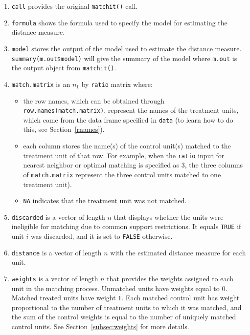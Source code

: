 \documentclass[oneside,letterpaper,titlepage]{article}
\begin{document}
\begin{enumerate}
\item \texttt{call} provides the original {\tt matchit()} call.
  
\item \texttt{formula} shows the formula used to specify the model for
  estimating the distance measure.
  
\item \texttt{model} stores the output of the model used to estimate
  the distance measure.  \texttt{summary(m.out\$model)} will give the
  summary of the model where \texttt{m.out} is the output object from
  \texttt{matchit()}.
  
\item \texttt{match.matrix} is an $n_1$ by \texttt{ratio} matrix
  where:
  \begin{itemize}
  \item the row names, which can be obtained through
    \texttt{row.names(match.matrix)}, represent the names of the
    treatment units, which come from the data frame specified in
    \texttt{data} (to learn how to do this, see Section~\ref{rnames}).
  \item each column stores the name(s) of the control unit(s) matched
    to the treatment unit of that row. For example, when the
    \texttt{ratio} input for nearest neighbor or optimal matching is
    specified as 3, the three columns of \texttt{match.matrix}
    represent the three control units matched to one treatment unit).
  \item \texttt{NA} indicates that the treatment unit was not matched.
  \end{itemize}
   
\item \texttt{discarded} is a vector of length $n$ that displays
  whether the units were ineligible for matching due to common support
  restrictions.  It equals \texttt{TRUE} if unit $i$ was discarded,
  and it is set to \texttt{FALSE} otherwise.
  
\item \texttt{distance} is a vector of length $n$ with the estimated
  distance measure for each unit.
  
\item \texttt{weights} is a vector of length $n$ that provides the
  weights assigned to each unit in the matching process.  Unmatched
  units have weights equal to $0$. Matched treated units have weight
  $1$.  Each matched control unit has weight proportional to the
  number of treatment units to which it was matched, and the sum of
  the control weights is equal to the number of uniquely matched
  control units. See Section~\ref{subsec:weights} for more details.
  

\end{enumerate}
\end{document}
